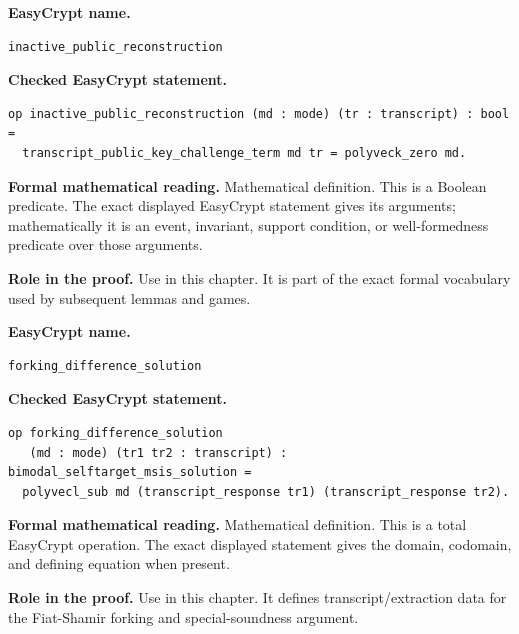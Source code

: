 \begin{formaldefinition}
\noindent\textbf{EasyCrypt name.}
\begin{lstlisting}[language=EasyCrypt,basicstyle=\ttfamily\scriptsize]
inactive_public_reconstruction
\end{lstlisting}
\noindent\textbf{Checked EasyCrypt statement.}
\begin{lstlisting}[language=EasyCrypt,basicstyle=\ttfamily\scriptsize]
op inactive_public_reconstruction (md : mode) (tr : transcript) : bool =
  transcript_public_key_challenge_term md tr = polyveck_zero md.
\end{lstlisting}
\noindent\textbf{Formal mathematical reading.}
Mathematical definition. This is a Boolean predicate.  The exact displayed EasyCrypt statement gives its arguments; mathematically it is an event, invariant, support condition, or well-formedness predicate over those arguments.

\noindent\textbf{Role in the proof.}
Use in this chapter. It is part of the exact formal vocabulary used by subsequent lemmas and games.

\end{formaldefinition}

\begin{formaldefinition}
\noindent\textbf{EasyCrypt name.}
\begin{lstlisting}[language=EasyCrypt,basicstyle=\ttfamily\scriptsize]
forking_difference_solution
\end{lstlisting}
\noindent\textbf{Checked EasyCrypt statement.}
\begin{lstlisting}[language=EasyCrypt,basicstyle=\ttfamily\scriptsize]
op forking_difference_solution
   (md : mode) (tr1 tr2 : transcript) : bimodal_selftarget_msis_solution =
  polyvecl_sub md (transcript_response tr1) (transcript_response tr2).
\end{lstlisting}
\noindent\textbf{Formal mathematical reading.}
Mathematical definition. This is a total EasyCrypt operation.  The exact displayed statement gives the domain, codomain, and defining equation when present.

\noindent\textbf{Role in the proof.}
Use in this chapter. It defines transcript/extraction data for the Fiat-Shamir forking and special-soundness argument.

\end{formaldefinition}

